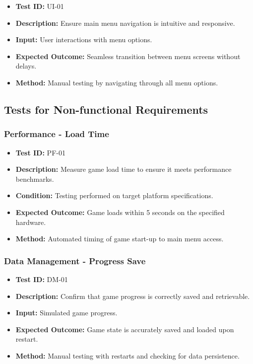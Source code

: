 \documentclass[12pt]{article}
\begin{document}
\begin{itemize}
    \item \textbf{Test ID:} UI-01
    \item \textbf{Description:} Ensure main menu navigation is intuitive and responsive.
    \item \textbf{Input:} User interactions with menu options.
    \item \textbf{Expected Outcome:} Seamless transition between menu screens without delays.
    \item \textbf{Method:} Manual testing by navigating through all menu options.
\end{itemize}

\subsection{Tests for Non-functional Requirements}

\subsubsection{Performance - Load Time}

\begin{itemize}
    \item \textbf{Test ID:} PF-01
    \item \textbf{Description:} Measure game load time to ensure it meets performance benchmarks.
    \item \textbf{Condition:} Testing performed on target platform specifications.
    \item \textbf{Expected Outcome:} Game loads within 5 seconds on the specified hardware.
    \item \textbf{Method:} Automated timing of game start-up to main menu access.
\end{itemize}

\subsubsection{Data Management - Progress Save}

\begin{itemize}
    \item \textbf{Test ID:} DM-01
    \item \textbf{Description:} Confirm that game progress is correctly saved and retrievable.
    \item \textbf{Input:} Simulated game progress.
    \item \textbf{Expected Outcome:} Game state is accurately saved and loaded upon restart.
    \item \textbf{Method:} Manual testing with restarts and checking for data persistence.
\end{itemize}
\end{document}
